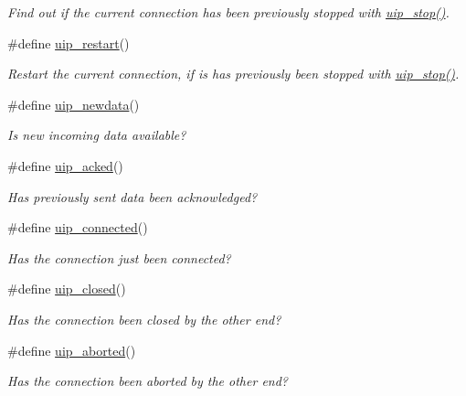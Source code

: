 \begin{CompactItemize}
\begin{CompactList}\small\item\em Find out if the current connection has been previously stopped with \hyperlink{a00064_g0a8bb9d6d0f1f56852ccfccbbad6c5d8}{uip\_\-stop()}. \item\end{CompactList}\item 
\#define \hyperlink{a00064_g81ac47cee1c18f6aa479044069db7ca3}{uip\_\-restart}()
\begin{CompactList}\small\item\em Restart the current connection, if is has previously been stopped with \hyperlink{a00064_g0a8bb9d6d0f1f56852ccfccbbad6c5d8}{uip\_\-stop()}. \item\end{CompactList}\item 
\#define \hyperlink{a00064_g26a14b8dae3f861830af9e7cf1e03725}{uip\_\-newdata}()
\begin{CompactList}\small\item\em Is new incoming data available? \item\end{CompactList}\item 
\#define \hyperlink{a00064_gde6634974418e3240c212b9b16864368}{uip\_\-acked}()
\begin{CompactList}\small\item\em Has previously sent data been acknowledged? \item\end{CompactList}\item 
\#define \hyperlink{a00064_gdb971fb1525d0c5002f52125b05f3218}{uip\_\-connected}()
\begin{CompactList}\small\item\em Has the connection just been connected? \item\end{CompactList}\item 
\#define \hyperlink{a00064_gef6c4140c632b6a406779342cf3b6eb6}{uip\_\-closed}()
\begin{CompactList}\small\item\em Has the connection been closed by the other end? \item\end{CompactList}\item 
\#define \hyperlink{a00064_gfbd5fc486dfdf6bf6fc9db52b1f418c4}{uip\_\-aborted}()
\begin{CompactList}\small\item\em Has the connection been aborted by the other end? \item\end{CompactList}\item 

\end{CompactItemize}
